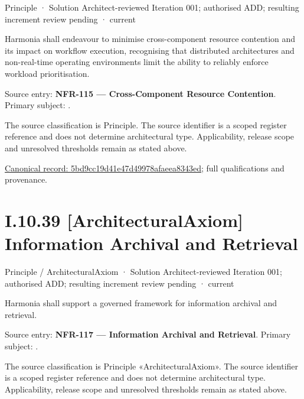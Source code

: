 \label{element:5bd9cc19d41e47d49978afaeea8343ed}
{\small Principle · Solution Architect-reviewed Iteration 001; authorised ADD; resulting increment review pending · current}\par

Harmonia shall endeavour to minimise cross-component resource contention and its impact on workflow execution, recognising that distributed architectures and non-real-time operating environments limit the ability to reliably enforce workload prioritisation.



Source entry: \textbf{NFR-115 — Cross-Component Resource Contention}. Primary subject: \texttt{}.



The source classification is Principle. The source identifier is a scoped register reference and does not determine architectural type. Applicability, release scope and unresolved thresholds remain as stated above.


{\footnotesize \href{../../../../continuum/motivation/principle/5bd9cc19d41e47d49978afaeea8343ed.md}{Canonical record: 5bd9cc19d41e47d49978afaeea8343ed}; full qualifications and provenance.}\par
\section*{I.10.39 [ArchitecturalAxiom] Information Archival and Retrieval}
\label{navigation:I.10.39}

\label{element:2429db4dbecc4a03a66f5189d76a6c38}
{\small Principle / ArchitecturalAxiom · Solution Architect-reviewed Iteration 001; authorised ADD; resulting increment review pending · current}\par

Harmonia shall support a governed framework for information archival and retrieval.



Source entry: \textbf{NFR-117 — Information Archival and Retrieval}. Primary subject: \texttt{}.



The source classification is Principle «ArchitecturalAxiom». The source identifier is a scoped register reference and does not determine architectural type. Applicability, release scope and unresolved thresholds remain as stated above.


